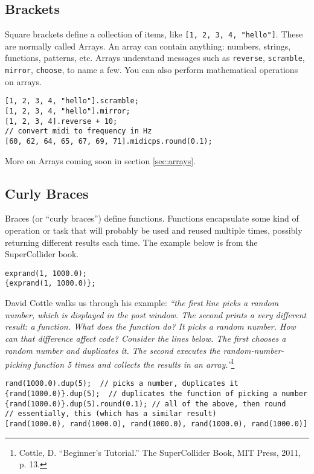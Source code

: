 \subsection{Brackets}

Square brackets define a collection of items, like \texttt{[1, 2, 3, 4, "hello"]}. These are normally called Arrays. An array can contain anything: numbers, strings, functions, patterns, etc. Arrays understand messages such as \texttt{reverse}, \texttt{scramble}, \texttt{mirror}, \texttt{choose}, to name a few. You can also perform mathematical operations on arrays.

\begin{lstlisting}[style=SuperCollider-IDE, basicstyle=\scttfamily\footnotesize]
[1, 2, 3, 4, "hello"].scramble;
[1, 2, 3, 4, "hello"].mirror;
[1, 2, 3, 4].reverse + 10;
// convert midi to frequency in Hz
[60, 62, 64, 65, 67, 69, 71].midicps.round(0.1);
\end{lstlisting}

More on Arrays coming soon in section \ref{sec:arrays}.

\subsection{Curly Braces}

Braces (or ``curly braces'') define functions. Functions encapsulate some kind of operation or task that will probably be used and reused multiple times, possibly returning different results each time. The example below is from the SuperCollider book.

\begin{lstlisting}[style=SuperCollider-IDE, basicstyle=\scttfamily\footnotesize]
exprand(1, 1000.0);
{exprand(1, 1000.0)};
\end{lstlisting}

David Cottle walks us through his example: \textit{``the first line picks a random number, which is displayed in the post window. The second prints a very different result: a function. What does the function do? It picks a random number. How can that difference affect code? Consider the lines below. The first chooses a random number and duplicates it. The second executes the random-number-picking function 5 times and collects the results in an array.''}\footnote{Cottle, D. ``Beginner's Tutorial.'' The SuperCollider Book, MIT Press, 2011, p. 13.}

\begin{lstlisting}[style=SuperCollider-IDE, basicstyle=\scttfamily\footnotesize]
rand(1000.0).dup(5);  // picks a number, duplicates it
{rand(1000.0)}.dup(5);  // duplicates the function of picking a number
{rand(1000.0)}.dup(5).round(0.1); // all of the above, then round
// essentially, this (which has a similar result)
[rand(1000.0), rand(1000.0), rand(1000.0), rand(1000.0), rand(1000.0)]
\end{lstlisting}
 

